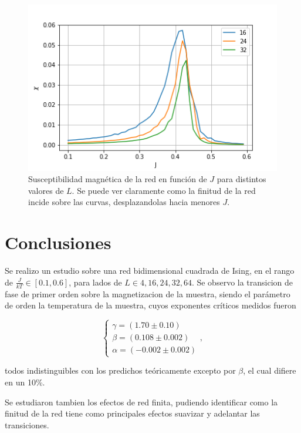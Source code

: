\documentclass[
 reprint,
 amsmath,amssymb,
 aps,
]{revtex4-1}
\begin{document}
\begin{figure}
  \includegraphics[width=1.0\columnwidth]{images/chi_vs_l.png}
  \caption{Susceptibilidad magn\'etica de la red en funci\'on de $J$ para distintos valores de $L$. Se puede ver claramente como la finitud de la red incide sobre las curvas, desplazandolas hacia menores $J$.}
  \label{chi_vs_l}
\end{figure}

\section{\label{conclusions}Conclusiones}

Se realizo un estudio sobre una red bidimensional cuadrada de Ising, en el rango
de $\frac{J}{kT} \in [0.1, 0.6]$, para lados de $L \in {4, 16, 24, 32, 64}$. Se
observo la transicion de fase de primer orden sobre la magnetizacion de la
muestra, siendo el par\'ametro de orden la temperatura de la muestra, cuyos
exponentes cr\'iticos medidos fueron

$$
\left \{
  \begin{matrix}
    \gamma = (1.70 \pm 0.10) \\
    \beta = (0.108 \pm 0.002) \\
    \alpha = (-0.002 \pm 0.002)
  \end{matrix}
\right. ,
$$

todos indistinguibles con los predichos te\'oricamente excepto por $\beta$, el cual difiere en un 10\%.

Se estudiaron tambien los efectos de red finita, pudiendo identificar como la
finitud de la red tiene como principales efectos suavizar y adelantar las
transiciones.

\appendix

\end{document}
